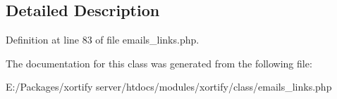 \subsection{Detailed Description}


Definition at line 83 of file emails\-\_\-links.\-php.



The documentation for this class was generated from the following file\-:\begin{DoxyCompactItemize}
\item 
E\-:/\-Packages/xortify server/htdocs/modules/xortify/class/emails\-\_\-links.\-php\end{DoxyCompactItemize}
